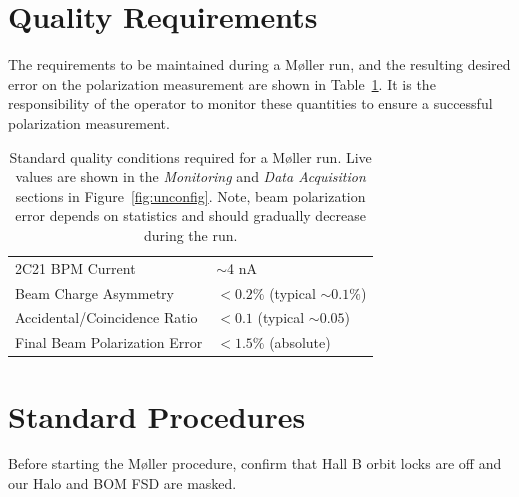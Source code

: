 \documentclass[amsmath,amssymb,notitlepage,12pt]{revtex4}
\begin{document}
\section{Quality Requirements}\label{sec:quality}
The requirements to be maintained during a M{\o}ller run, and the resulting desired error on the polarization measurement are shown in Table~\ref{tab:reqs}.  It is the responsibility of the operator to monitor these quantities to ensure a successful polarization measurement.
\begin{table}[htbp]\centering
    \begin{tabular}{ll}\toprule[1.5pt]
        2C21 BPM Current & $\sim$4 nA\\
        Beam Charge Asymmetry & $<0.2\%$ (typical $\sim 0.1\%$)\\
        Accidental/Coincidence Ratio & $<0.1$ (typical $\sim 0.05$)\\
        Final Beam Polarization Error & $<1.5\%$ (absolute)\\
        \bottomrule[1.5pt]
    \end{tabular}
    \caption{Standard quality conditions required for a M{\o}ller run.  Live values are shown in the {\em Monitoring} and {\em Data Acquisition} sections in Figure~\ref{fig:unconfig}.  Note, beam polarization error depends on statistics and should gradually decrease during the run.\label{tab:reqs}}
\end{table}

\newpage

\section{Standard Procedures}\label{sec:user}
Before starting the M{\o}ller procedure, confirm that Hall B orbit locks are off and our Halo and BOM FSD are masked.
\end{document}
